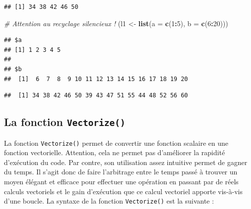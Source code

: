 \documentclass[
  11pt,
]{book}
\newenvironment{Shaded}{\begin{snugshade}}{\end{snugshade}}
\newcommand{\CommentTok}[1]{\textcolor[rgb]{0.56,0.35,0.01}{\textit{#1}}}
\newcommand{\DataTypeTok}[1]{\textcolor[rgb]{0.13,0.29,0.53}{#1}}
\newcommand{\DecValTok}[1]{\textcolor[rgb]{0.00,0.00,0.81}{#1}}
\newcommand{\KeywordTok}[1]{\textcolor[rgb]{0.13,0.29,0.53}{\textbf{#1}}}
\newcommand{\NormalTok}[1]{#1}
\newcommand{\OperatorTok}[1]{\textcolor[rgb]{0.81,0.36,0.00}{\textbf{#1}}}
\newcommand{\StringTok}[1]{\textcolor[rgb]{0.31,0.60,0.02}{#1}}
\numberwithin{equation}{section}
\numberwithin{countremarque}{section}
\begin{document}
\begin{Shaded}
\end{Shaded}

\begin{lstlisting}
## [1] 34 38 42 46 50
\end{lstlisting}

\begin{Shaded}
\begin{Highlighting}[]
\CommentTok{\# Attention au recyclage silencieux !}
\NormalTok{(l1 \textless{}{-}}\StringTok{ }\KeywordTok{list}\NormalTok{(}\DataTypeTok{a =} \KeywordTok{c}\NormalTok{(}\DecValTok{1}\OperatorTok{:}\DecValTok{5}\NormalTok{), }\DataTypeTok{b =} \KeywordTok{c}\NormalTok{(}\DecValTok{6}\OperatorTok{:}\DecValTok{20}\NormalTok{)))}
\end{Highlighting}
\end{Shaded}

\begin{lstlisting}
## $a
## [1] 1 2 3 4 5
## 
## $b
##  [1]  6  7  8  9 10 11 12 13 14 15 16 17 18 19 20
\end{lstlisting}

\begin{Shaded}
\end{Shaded}

\begin{lstlisting}
##  [1] 34 38 42 46 50 39 43 47 51 55 44 48 52 56 60
\end{lstlisting}

\hypertarget{boucles_vectorisation_Vectorize}{%
\subsection{\texorpdfstring{La fonction \texttt{Vectorize()}}{La fonction Vectorize()}}\label{boucles_vectorisation_Vectorize}}

La fonction \texttt{Vectorize()} permet de convertir une fonction scalaire en une fonction vectorielle. Attention, cela ne permet pas d'améliorer la rapidité d'exécution du code. Par contre, son utilisation assez intuitive permet de gagner du temps. Il s'agit donc de faire l'arbitrage entre le temps passé à trouver un moyen élégant et efficace pour effectuer une opération en passant par de réels calculs vectoriels et le gain d'exécution que ce calcul vectoriel apporte vis-à-vis d'une boucle. La syntaxe de la fonction \texttt{Vectorize()} est la suivante :
\end{document}
